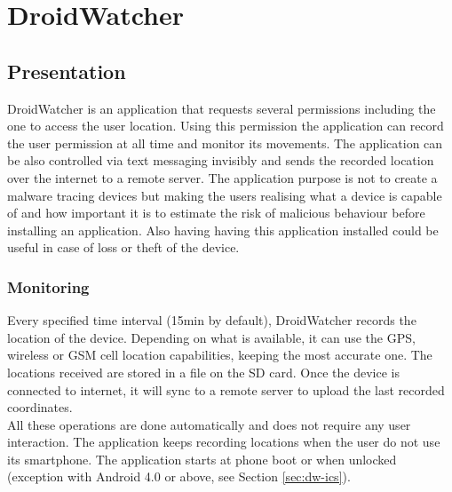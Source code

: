
\chapter{DroidWatcher}
\label{chap:droidwatcher}

\section{Presentation}


DroidWatcher is an application that requests several permissions including the one to access the user location.
Using this permission the application can record the user permission at all time and monitor its movements.
The application can be also controlled via text messaging invisibly and sends the recorded location over the internet to a remote server.
The application purpose is not to create a malware tracing devices but making the users realising what a device is capable of and how important it is to estimate the risk of malicious behaviour before installing an application.
Also having having this application installed could be useful in case of loss or theft of the device.\\

\subsection{Monitoring}

Every specified time interval (15min by default), DroidWatcher records the location of the device.
Depending on what is available, it can use the GPS, wireless or GSM cell location capabilities, keeping the most accurate one.
The locations received are stored in a file on the SD card.
Once the device is connected to internet, it will sync to a remote server to upload the last recorded coordinates.\\

All these operations are done automatically and does not require any user interaction.
The application keeps recording locations when the user do not use its smartphone.
The application starts at phone boot or when unlocked (exception with Android 4.0 or above, see Section \ref{sec:dw-ics}).

